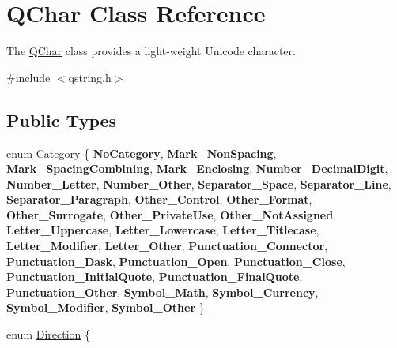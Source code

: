 \hypertarget{class_q_char}{}\section{Q\+Char Class Reference}
\label{class_q_char}


The \mbox{\hyperlink{class_q_char}{Q\+Char}} class provides a light-\/weight Unicode character.  




{\ttfamily \#include $<$qstring.\+h$>$}

\subsection*{Public Types}
\begin{DoxyCompactItemize}
\item 
enum \mbox{\hyperlink{class_q_char_a62908095db0c54f35ff2ae928c621a97}{Category}} \{ \newline
{\bfseries No\+Category}, 
{\bfseries Mark\+\_\+\+Non\+Spacing}, 
{\bfseries Mark\+\_\+\+Spacing\+Combining}, 
{\bfseries Mark\+\_\+\+Enclosing}, 
\newline
{\bfseries Number\+\_\+\+Decimal\+Digit}, 
{\bfseries Number\+\_\+\+Letter}, 
{\bfseries Number\+\_\+\+Other}, 
{\bfseries Separator\+\_\+\+Space}, 
\newline
{\bfseries Separator\+\_\+\+Line}, 
{\bfseries Separator\+\_\+\+Paragraph}, 
{\bfseries Other\+\_\+\+Control}, 
{\bfseries Other\+\_\+\+Format}, 
\newline
{\bfseries Other\+\_\+\+Surrogate}, 
{\bfseries Other\+\_\+\+Private\+Use}, 
{\bfseries Other\+\_\+\+Not\+Assigned}, 
{\bfseries Letter\+\_\+\+Uppercase}, 
\newline
{\bfseries Letter\+\_\+\+Lowercase}, 
{\bfseries Letter\+\_\+\+Titlecase}, 
{\bfseries Letter\+\_\+\+Modifier}, 
{\bfseries Letter\+\_\+\+Other}, 
\newline
{\bfseries Punctuation\+\_\+\+Connector}, 
{\bfseries Punctuation\+\_\+\+Dask}, 
{\bfseries Punctuation\+\_\+\+Open}, 
{\bfseries Punctuation\+\_\+\+Close}, 
\newline
{\bfseries Punctuation\+\_\+\+Initial\+Quote}, 
{\bfseries Punctuation\+\_\+\+Final\+Quote}, 
{\bfseries Punctuation\+\_\+\+Other}, 
{\bfseries Symbol\+\_\+\+Math}, 
\newline
{\bfseries Symbol\+\_\+\+Currency}, 
{\bfseries Symbol\+\_\+\+Modifier}, 
{\bfseries Symbol\+\_\+\+Other}
 \}
\item 
enum \mbox{\hyperlink{class_q_char_a54978126be7630b3e85394325a822302}{Direction}} \{ \newline

\end{DoxyCompactItemize}

